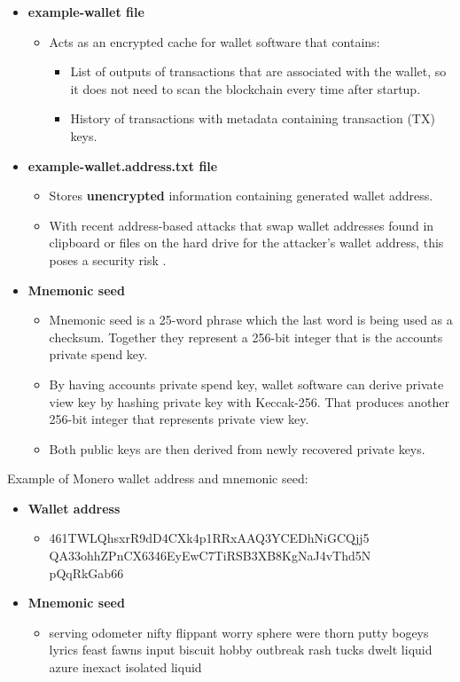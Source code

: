 \documentclass[
  printed, %
  table,   %
  lof,     %
  lot,     %
           oneside, color
]{fithesis3}
\renewcommand{\texttt}[1]{%
  \begingroup
  \ttfamily
  \begingroup\lccode`~=`/\lowercase{\endgroup\def~}{/\discretionary{}{}{}}%
  \begingroup\lccode`~=`[\lowercase{\endgroup\def~}{[\discretionary{}{}{}}%
  \begingroup\lccode`~=`.\lowercase{\endgroup\def~}{.\discretionary{}{}{}}%
  \catcode`/=\active\catcode`[=\active\catcode`.=\active
  \scantokens{#1\noexpand}%
  \endgroup
}
\begin{document}
\begin{itemize}
\item \textbf{example-wallet file}
\begin{itemize}\itemsep0em
\item Acts as an encrypted cache for wallet software that contains:
\begin{itemize}\itemsep0em
\item List of outputs of transactions that are associated with the wallet, so it does not need to scan the blockchain every time after startup.
\item History of transactions with metadata containing transaction (TX) keys.
\end{itemize}
\end{itemize}
\item \textbf{example-wallet.address.txt file}
\begin{itemize}\itemsep0em
\item Stores \textbf{unencrypted} information containing generated wallet address.
\item With recent address-based attacks that swap wallet addresses found in clipboard or files on the hard drive for the attacker's wallet address, this poses a security risk \cite{cryptoshuffler}.
\end{itemize}
\item \textbf{Mnemonic seed}
\begin{itemize}\itemsep0em
\item Mnemonic seed is a 25-word phrase which the last word is being used as a checksum. Together they represent a 256-bit integer that is the accounts private spend key.
\item By having accounts private spend key, wallet software can derive private view key by hashing private key with Keccak-256. That produces another 256-bit integer that represents private view key.
\item Both public keys are then derived from newly recovered private keys.
\end{itemize}
\end{itemize}
Example of Monero wallet address and mnemonic seed:
\begin{itemize}\itemsep0em
\item \textbf{Wallet address}
\begin{itemize}\itemsep0em
\item 461TWLQhsxrR9dD4CXk4p1RRxAAQ3YCEDhNiGCQjj5\\QA33ohhZPnCX6346EyEwC7TiRSB3XB8KgNaJ4vThd5N\\pQqRkGab66
\end{itemize}
\item \textbf{Mnemonic seed}
\begin{itemize}\itemsep0em
\item serving odometer nifty flippant worry sphere were thorn putty bogeys lyrics feast fawns input biscuit hobby outbreak rash tucks dwelt liquid azure inexact isolated liquid
\end{itemize}
\end{itemize}
\end{document}
